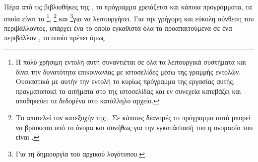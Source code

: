 \documentclass[12pt]{report}
\begin{document}
Πέρα από τις βιβλιοθήκες της {}, το πρόγραμμα χρειάζεται και κάποια {} προγράμματα, τα οποία είναι το {}\footnote{Η πολύ χρήσιμη εντολή αυτή συναντιέται σε όλα τα λειτουργικά 
συστήματα και δίνει την δυνατότητα επικοινωνίας με ιστοσελίδες μέσω της γραμμής εντολών. Ουσιαστικά με αυτήν την εντολή το κυρίως πρόγραμμα της εργασίας αυτής, πραγματοποιεί τα αιτήματα στο {} της ιστοσελίδας και εν
συνεχεία κατεβάζει και αποθηκεύει τα δεδομένα στο κατάλληλο αρχείο.}, {}\footnote{Το {} αποτελεί τον κατεξοχήν {} της {}. Σε κάποιες διανομές 
{} το πρόγραμμα αυτό μπορεί να βρίσκεται υπό το όνομα {} και συνήθως για την εγκατάστασή του η ονομασία του είναι {}.} και {}\footnote{Για τη δημιουργία του 
αρχικού λογότυπου.}για να λειτουργήσει. Για την γρήγορη και εύκολη σύνθεση του περιβάλλοντος, υπάρχει ένα {} το οποίο εγκαθιστά όλα τα προαπαιτούμενα σε ένα περιβάλλον {}, το οποίο πρέπει όμως 
\end{document}
